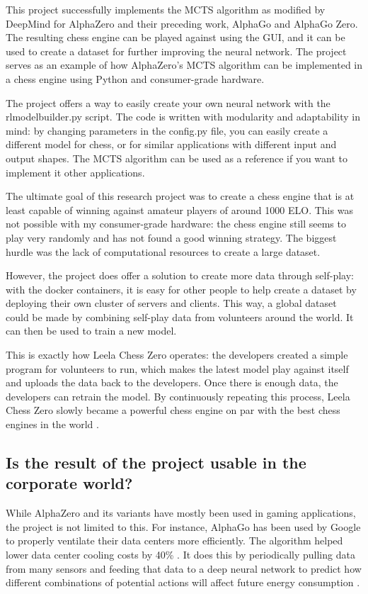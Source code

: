 \documentclass{article}
\begin{document}
This project successfully implements the MCTS algorithm as modified by DeepMind for AlphaZero and their preceding work,
AlphaGo and AlphaGo Zero. The resulting chess engine can be played against using the GUI, and it can be used to create
a dataset for further improving the neural network. The project serves as an example of how AlphaZero's MCTS algorithm 
can be implemented in a chess engine using Python and consumer-grade hardware. 

The project offers a way to easily create your own neural network with the rlmodelbuilder.py script.
The code is written with modularity and adaptability in mind: by changing parameters in the config.py file, 
you can easily create a different model for chess, or for similar applications with different input and output shapes. 
The MCTS algorithm can be used as a reference if you want to implement it other applications.

The ultimate goal of this research project was to create a chess engine that is at least capable of winning
against amateur players of around 1000 ELO. This was not possible with my consumer-grade hardware: 
the chess engine still seems to play very randomly and has not found a good winning strategy. 
The biggest hurdle was the lack of computational resources to create a large dataset.

However, the project does offer a solution to create more data through self-play: with the docker containers, 
it is easy for other people to help create a dataset by deploying their own cluster of servers and clients. 
This way, a global dataset could be made by combining self-play data from volunteers around the world. 
It can then be used to train a new model. 

This is exactly how Leela Chess Zero operates: the developers created a simple program for volunteers to run,
which makes the latest model play against itself and uploads the data back to the developers. Once there is
enough data, the developers can retrain the model. By continuously repeating this process, Leela Chess Zero
slowly became a powerful chess engine on par with the best chess engines in the world \cite{TopChessEngine2022}.

\subsection{Is the result of the project usable in the corporate world?}

While AlphaZero and its variants have mostly been used in gaming applications, 
the project is not limited to this. For instance, AlphaGo has been used by Google
to properly ventilate their data centers more efficiently. The algorithm helped lower
data center cooling costs by 40\% \cite{decemberHasGoogleCracked2020}. 
It does this by periodically pulling data from many sensors and feeding that data to 
a deep neural network to predict how different combinations of potential actions
will affect future energy consumption \cite{HowAIHelps2018}.
\end{document}
